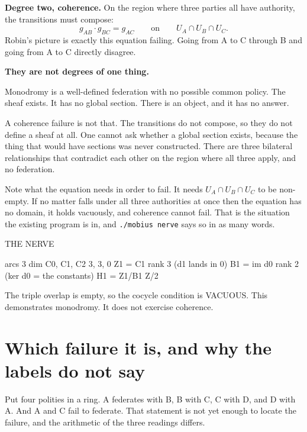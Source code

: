 \documentclass[11pt,a4paper]{article}
\begin{document}
\medskip
\textbf{Degree two, coherence.} On the region where three parties all have
authority, the transitions must compose:
\[
  g_{AB} \cdot g_{BC} = g_{AC}
  \qquad\text{on}\qquad
  U_A \cap U_B \cap U_C .
\]
Robin's picture is exactly this equation failing. Going from A to C through B
and going from A to C directly disagree.

\begin{alarmbox}
\textbf{They are not degrees of one thing.}

Monodromy is a well-defined federation with no possible common policy. The
sheaf exists. It has no global section. There is an object, and it has no
answer.

A coherence failure is not that. The transitions do not compose, so they do not
define a sheaf at all. One cannot ask whether a global section exists, because
the thing that would have sections was never constructed. There are three
bilateral relationships that contradict each other on the region where all
three apply, and no federation.
\end{alarmbox}

Note what the equation needs in order to fail. It needs $U_A \cap U_B \cap U_C$
to be non-empty. If no matter falls under all three authorities at once then
the equation has no domain, it holds vacuously, and coherence cannot fail. That
is the situation the existing program is in, and \texttt{./mobius nerve} says so
in as many words.

\begin{term}
  THE NERVE

    arcs                    3
    dim C0, C1, C2          3, 3, 0
    Z1 = C1                 rank 3   (d1 lands in 0)
    B1 = im d0              rank 2   (ker d0 = the constants)
    H1 = Z1/B1              Z/2

    The triple overlap is empty, so the cocycle condition is VACUOUS.
    This demonstrates monodromy. It does not exercise coherence.
\end{term}

\section{Which failure it is, and why the labels do not say}

Put four polities in a ring. A federates with B, B with C, C with D, and D with
A. And A and C fail to federate. That statement is not yet enough to locate the
failure, and the arithmetic of the three readings differs.
\end{document}
